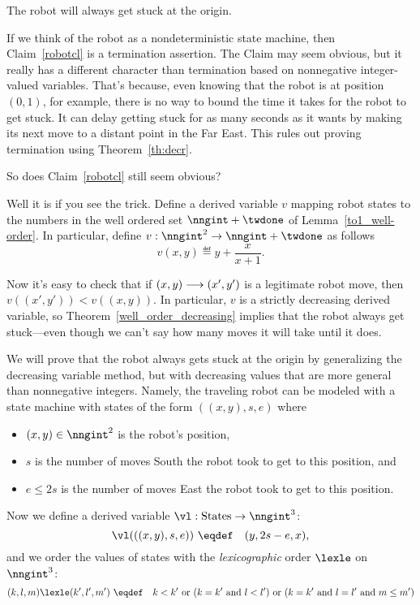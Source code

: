 \begin{claim}\label{robotcl}
The robot will always get stuck at the origin.
\end{claim}

If we think of the robot as a nondeterministic state machine, then
Claim~\ref{robotcl} is a termination assertion.  The Claim may seem
obvious, but it really has a different character than termination based on
nonnegative integer-valued variables.  That's because, even knowing that
the robot is at position $(0,1)$, for example, there is no way to bound
the time it takes for the robot to get stuck.  It can delay getting stuck
for as many seconds as it wants by making its next move to a distant point
in the Far East.  This rules out proving termination using
Theorem~\ref{th:decr}.

So does Claim~\ref{robotcl} still seem obvious?

Well it is if you see the trick.  Define a derived variable $v$ mapping
robot states to the numbers in the well ordered set $\nngint + \twdone$
of Lemma~\ref{to1_well-order}.  In particular, define
$v:\nngint^2 \to \nngint + \twdone$ as follows
\[
v(x,y) \eqdef y + \frac{x}{x+1}.
\]

Now it's easy to check that if $(x,y)\mathrel{\longrightarrow} (x',y')$ is a legitimate
robot move, then $v((x',y')) < v((x,y))$.  In particular, $v$ is a
strictly decreasing derived variable, so
Theorem~\ref{well_order_decreasing} implies that the robot always get
stuck---even though we can't say how many moves it will take until it
does.

\iffalse

We will prove that the robot always gets stuck at the origin by
generalizing the decreasing variable method, but with decreasing values
that are more general than nonnegative integers.  Namely, the traveling robot
can be modeled with a state machine with states of the form $((x,y),s,e)$
where
\begin{itemize}
\item $(x,y) \in \nngint^2$ is the robot's position,
\item $s$ is the number of moves South the robot took to get to this
position, and
\item $e \le 2s$ is the number of moves East the robot took to get to this
position. 
\end{itemize}

Now we define a derived variable $\vl:\text{States}\to \nngint^3$:
\[
\vl(((x,y),s,e)) \ \eqdef\quad (y,2s-e,x),
\]
and we order the values of states with the \emph{lexicographic} order
$\lexle$ on $\nngint^3$:
\begin{equation}\label{lex3}
(k,l,m) \lexle (k',l',m') \ \eqdef\quad k < k' \text{ or } (k=k' \text{
and } l < l') \text{ or } (k=k' \text{ and } l = l' \text{ and } m \le m')
\end{equation}

